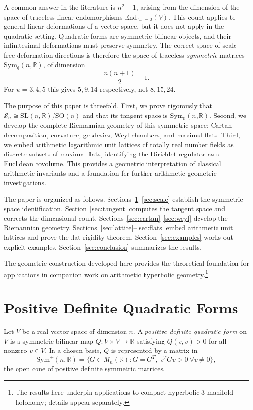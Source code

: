 \documentclass[12pt]{article}
\theoremstyle{definition}
\theoremstyle{remark}
\newcommand{\R}{\mathbb{R}}
\newcommand{\SL}{\mathrm{SL}}
\newcommand{\SO}{\mathrm{SO}}
\newcommand{\Symp}{\mathrm{Sym}^{+}}
\newcommand{\Symz}{\mathrm{Sym}_{0}}
\newcommand{\calM}{\mathcal{S}}
\newcommand{\tr}{\operatorname{tr}}
\begin{document}
A common answer in the literature is $n^2 - 1$, arising from the
dimension of the space of traceless linear endomorphisms
$\mathrm{End}_{\tr=0}(V)$.
This count applies to general linear deformations of a vector
space, but it does not apply in the quadratic setting.
Quadratic forms are symmetric bilinear objects, and their infinitesimal
deformations must preserve symmetry.
The correct space of scale-free deformation directions is therefore
the space of traceless \emph{symmetric} matrices $\Symz(n,\R)$, of
dimension
\[
  \frac{n(n+1)}{2} - 1.
\]
For $n = 3, 4, 5$ this gives $5, 9, 14$ respectively, not $8, 15, 24$.

The purpose of this paper is threefold.
First, we prove rigorously that $\calM_n \cong \SL(n,\R)/\SO(n)$
and that its tangent space is $\Symz(n,\R)$.
Second, we develop the complete Riemannian geometry of this symmetric
space: Cartan decomposition, curvature, geodesics, Weyl chambers, and
maximal flats.
Third, we embed arithmetic logarithmic unit lattices of totally real
number fields as discrete subsets of maximal flats, identifying the
Dirichlet regulator as a Euclidean covolume.
This provides a geometric interpretation of classical arithmetic
invariants and a foundation for further arithmetic-geometric
investigations.

The paper is organized as follows.
Sections~\ref{sec:forms}--\ref{sec:scale} establish the symmetric
space identification.
Section~\ref{sec:tangent} computes the tangent space and corrects
the dimensional count.
Sections~\ref{sec:cartan}--\ref{sec:weyl} develop the Riemannian
geometry.
Sections~\ref{sec:lattice}--\ref{sec:flats} embed arithmetic unit
lattices and prove the flat rigidity theorem.
Section~\ref{sec:examples} works out explicit examples.
Section~\ref{sec:conclusion} summarizes the results.

The geometric construction developed here provides the theoretical
foundation for applications in companion work on arithmetic
hyperbolic geometry.\footnote{The results here underpin applications
to compact hyperbolic 3-manifold holonomy; details appear separately.}

\section{Positive Definite Quadratic Forms}
\label{sec:forms}

Let $V$ be a real vector space of dimension $n$.
A \emph{positive definite quadratic form} on $V$ is a symmetric
bilinear map $Q : V \times V \to \R$ satisfying $Q(v,v) > 0$ for
all nonzero $v \in V$.
In a chosen basis, $Q$ is represented by a matrix in
\[
  \Symp(n,\R)
  = \{G \in M_n(\R) : G = G^T,\; v^T G v > 0\ \forall v \neq 0\},
\]
the open cone of positive definite symmetric matrices.
\end{document}
